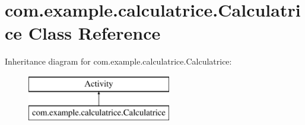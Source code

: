 \hypertarget{classcom_1_1example_1_1calculatrice_1_1_calculatrice}{\section{com.\-example.\-calculatrice.\-Calculatrice Class Reference}
\label{classcom_1_1example_1_1calculatrice_1_1_calculatrice}
}
Inheritance diagram for com.\-example.\-calculatrice.\-Calculatrice\-:\begin{figure}[H]
\begin{center}
\leavevmode
\includegraphics[height=2.000000cm]{classcom_1_1example_1_1calculatrice_1_1_calculatrice}
\end{center}
\end{figure}
